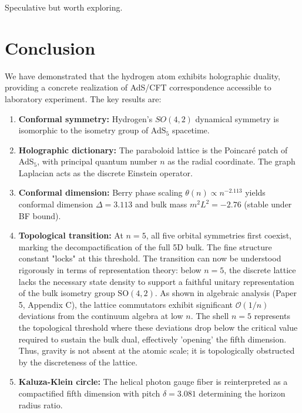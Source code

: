 \documentclass[aps,prd,twocolumn,superscriptaddress,floatfix]{revtex4-2}
\newcommand{\SO}{\ensuremath{\text{SO}}}
\begin{document}
Speculative but worth exploring.


\section{Conclusion}

We have demonstrated that the hydrogen atom exhibits holographic duality, providing a concrete realization of AdS/CFT correspondence accessible to laboratory experiment. The key results are:

\begin{enumerate}
\item \textbf{Conformal symmetry:} Hydrogen's $SO(4,2)$ dynamical symmetry is isomorphic to the isometry group of AdS$_5$ spacetime.

\item \textbf{Holographic dictionary:} The paraboloid lattice is the Poincaré patch of AdS$_5$, with principal quantum number $n$ as the radial coordinate. The graph Laplacian acts as the discrete Einstein operator.

\item \textbf{Conformal dimension:} Berry phase scaling $\theta(n) \propto n^{-2.113}$ yields conformal dimension $\Delta = 3.113$ and bulk mass $m^2 L^2 = -2.76$ (stable under BF bound).

\item \textbf{Topological transition:} At $n=5$, all five orbital symmetries first coexist, marking the decompactification of the full 5D bulk. The fine structure constant "locks" at this threshold. The transition can now be understood rigorously in terms of representation theory: below $n=5$, the discrete lattice lacks the necessary state density to support a faithful unitary representation of the bulk isometry group $\SO(4,2)$. As shown in algebraic analysis (Paper 5, Appendix C), the lattice commutators exhibit significant $\mathcal{O}(1/n)$ deviations from the continuum algebra at low $n$. The shell $n=5$ represents the topological threshold where these deviations drop below the critical value required to sustain the bulk dual, effectively 'opening' the fifth dimension. Thus, gravity is not absent at the atomic scale; it is topologically obstructed by the discreteness of the lattice.

\item \textbf{Kaluza-Klein circle:} The helical photon gauge fiber is reinterpreted as a compactified fifth dimension with pitch $\delta = 3.081$ determining the horizon radius ratio.


\end{enumerate}
\end{document}

